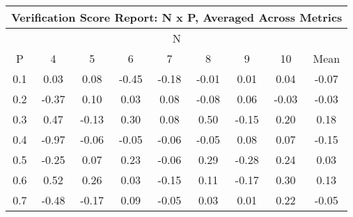 \begin{longtable}{ | c || c | c | c | c | c | c | c || c |}
\hline
\multicolumn{9}{|c|}{ Verification Score Report: N x P, Averaged Across Metrics } \\
\hline
\multicolumn{9}{|c|}{ N } \\
\hline
P & 4 & 5 & 6 & 7 & 8 & 9 & 10 & Mean\\
\hline
\hline
\endhead
0.1 &  \cellcolor[HTML]{FFFFFF} 0.03 &  \cellcolor[HTML]{FFFFFF} 0.08 &  \cellcolor[HTML]{FFF7F7} -0.45 &  \cellcolor[HTML]{FFF7F7} -0.18 &  \cellcolor[HTML]{FFFFFF} -0.01 &  \cellcolor[HTML]{FFFFFF} 0.01 &  \cellcolor[HTML]{FFFFFF} 0.04 &  \cellcolor[HTML]{FFFFFF} -0.07 \\
0.2 &  \cellcolor[HTML]{FFF7F7} -0.37 &  \cellcolor[HTML]{FFFFFF} 0.10 &  \cellcolor[HTML]{FFFFFF} 0.03 &  \cellcolor[HTML]{FFFFFF} 0.08 &  \cellcolor[HTML]{FFFFFF} -0.08 &  \cellcolor[HTML]{FFFFFF} 0.06 &  \cellcolor[HTML]{FFFFFF} -0.03 &  \cellcolor[HTML]{FFFFFF} -0.03 \\
0.3 &  \cellcolor[HTML]{F7F7FF} 0.47 &  \cellcolor[HTML]{FFFFFF} -0.13 &  \cellcolor[HTML]{F7F7FF} 0.30 &  \cellcolor[HTML]{FFFFFF} 0.08 &  \cellcolor[HTML]{EFEFFF} 0.50 &  \cellcolor[HTML]{FFFFFF} -0.15 &  \cellcolor[HTML]{F7F7FF} 0.20 &  \cellcolor[HTML]{F7F7FF} 0.18 \\
0.4 &  \cellcolor[HTML]{FFE7E7} -0.97 &  \cellcolor[HTML]{FFFFFF} -0.06 &  \cellcolor[HTML]{FFFFFF} -0.05 &  \cellcolor[HTML]{FFFFFF} -0.06 &  \cellcolor[HTML]{FFFFFF} -0.05 &  \cellcolor[HTML]{FFFFFF} 0.08 &  \cellcolor[HTML]{FFFFFF} 0.07 &  \cellcolor[HTML]{FFFFFF} -0.15 \\
0.5 &  \cellcolor[HTML]{FFF7F7} -0.25 &  \cellcolor[HTML]{FFFFFF} 0.07 &  \cellcolor[HTML]{F7F7FF} 0.23 &  \cellcolor[HTML]{FFFFFF} -0.06 &  \cellcolor[HTML]{F7F7FF} 0.29 &  \cellcolor[HTML]{FFF7F7} -0.28 &  \cellcolor[HTML]{F7F7FF} 0.24 &  \cellcolor[HTML]{FFFFFF} 0.03 \\
0.6 &  \cellcolor[HTML]{EFEFFF} 0.52 &  \cellcolor[HTML]{F7F7FF} 0.26 &  \cellcolor[HTML]{FFFFFF} 0.03 &  \cellcolor[HTML]{FFFFFF} -0.15 &  \cellcolor[HTML]{FFFFFF} 0.11 &  \cellcolor[HTML]{FFF7F7} -0.17 &  \cellcolor[HTML]{F7F7FF} 0.30 &  \cellcolor[HTML]{FFFFFF} 0.13 \\
0.7 &  \cellcolor[HTML]{FFF7F7} -0.48 &  \cellcolor[HTML]{FFF7F7} -0.17 &  \cellcolor[HTML]{FFFFFF} 0.09 &  \cellcolor[HTML]{FFFFFF} -0.05 &  \cellcolor[HTML]{FFFFFF} 0.03 &  \cellcolor[HTML]{FFFFFF} 0.01 &  \cellcolor[HTML]{F7F7FF} 0.22 &  \cellcolor[HTML]{FFFFFF} -0.05 \\

\end{longtable}
